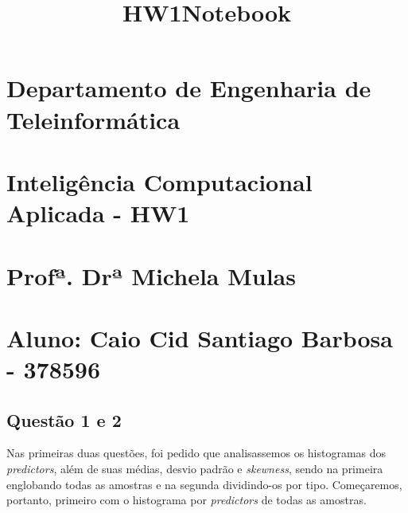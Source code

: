 \documentclass[11pt]{article}
\title{HW1Notebook}
\begin{document}
    
    
    \maketitle
    
    

    
    \section{Departamento de Engenharia de
Teleinformática}\label{departamento-de-engenharia-de-teleinformuxe1tica}

\section{Inteligência Computacional Aplicada -
HW1}\label{inteliguxeancia-computacional-aplicada---hw1}

\section{Profª. Drª Michela Mulas}\label{profuxaa.-druxaa-michela-mulas}

\section{Aluno: Caio Cid Santiago Barbosa -
378596}\label{aluno-caio-cid-santiago-barbosa---378596}

    \subsection{Questão 1 e 2}\label{questuxe3o-1-e-2}

Nas primeiras duas questões, foi pedido que analisassemos os histogramas
dos \emph{predictors}, além de suas médias, desvio padrão e
\emph{skewness}, sendo na primeira englobando todas as amostras e na
segunda dividindo-os por tipo. Começaremos, portanto, primeiro com o
histograma por \emph{predictors} de todas as amostras.
\end{document}
